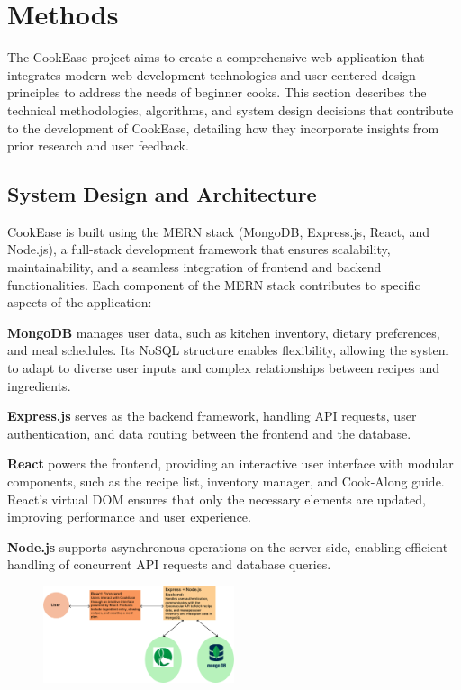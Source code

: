 \documentclass[10pt,twocolumn]{article}
\begin{document}
\section{Methods}
The CookEase project aims to create a comprehensive web application that integrates modern web development technologies and user-centered design principles to address the needs of beginner cooks. This section describes the technical methodologies, algorithms, and system design decisions that contribute to the development of CookEase, detailing how they incorporate insights from prior research and user feedback.

\subsection{System Design and Architecture}
CookEase is built using the MERN stack (MongoDB, Express.js, React, and Node.js), a full-stack development framework that ensures scalability, maintainability, and a seamless integration of frontend and backend functionalities. Each component of the MERN stack contributes to specific aspects of the application:

\textbf{MongoDB} manages user data, such as kitchen inventory, dietary preferences, and meal schedules. Its NoSQL structure enables flexibility, allowing the system to adapt to diverse user inputs and complex relationships between recipes and ingredients.

\textbf{Express.js} serves as the backend framework, handling API requests, user authentication, and data routing between the frontend and the database.

\textbf{React} powers the frontend, providing an interactive user interface with modular components, such as the recipe list, inventory manager, and Cook-Along guide. React's virtual DOM ensures that only the necessary elements are updated, improving performance and user experience.

\textbf{Node.js} supports asynchronous operations on the server side, enabling efficient handling of concurrent API requests and database queries.
\begin{figure}[h!]
\includegraphics[width=0.5\textwidth]{images/CodeArcDiagram.png}
\centering
\end{figure} 
\end{document}
